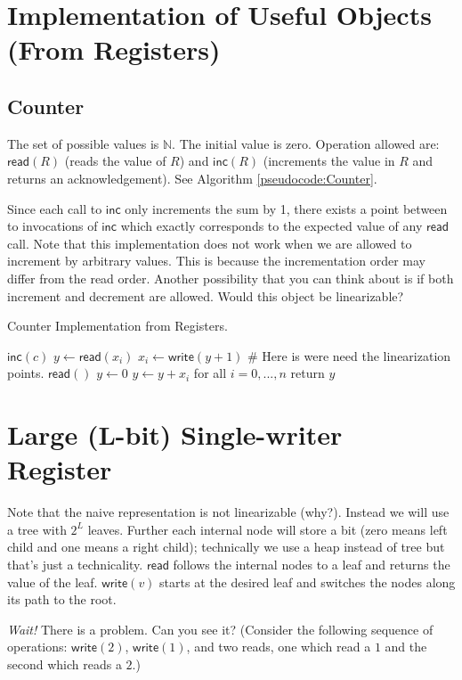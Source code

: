 \documentclass[twoside]{article}
\newcommand\N{\mathbb{N}}
\newcommand\READ{\mathsf{read}}
\newcommand\INC{\mathsf{inc}}
\newcommand\WRITE{\mathsf{write}}
\begin{document}
\section{Implementation of Useful Objects (From Registers)}
\subsection{Counter}
The set of possible values is $\N$. The initial value is zero. Operation allowed are: $\READ (R)$ (reads the value of $R$) and $\INC (R)$ (increments the value in $R$ and returns an acknowledgement). See Algorithm \ref{pseudocode:Counter}.

Since each call to $\INC$ only increments the sum by 1, there exists a point between to invocations of $\INC$ which exactly corresponds to the expected value of any $\READ$ call. Note that this implementation does not work when we are allowed to increment by arbitrary values. This is because the incrementation order may differ from the read order. Another possibility that you can think about is if both increment and decrement are allowed. Would this object be linearizable?

\begin{algorithm}
	\caption{Counter Implementation from Registers.}
    \label{pseudocode:Counter}
    \begin{algorithmic}[1]
    \State $\INC(c)$
    \State $y \leftarrow \READ(x_i)$
    \State $x_i \leftarrow \WRITE(y + 1)$ \# Here is were need the linearization points.
    \State
    \State $\READ()$
    \State $y \leftarrow 0$
    \State $y \leftarrow y + x_i$ for all $i = 0, ..., n$
    \State return $y$
    \end{algorithmic}
\end{algorithm}

\section{Large (L-bit) Single-writer Register}
Note that the naive representation is not linearizable (why?). Instead we will use a tree with $2^L$ leaves. Further each internal node will store a bit (zero means left child and one means a right child); technically we use a heap instead of tree but that's just a technicality. $\READ$ follows the internal nodes to a leaf and returns the value of the leaf. $\WRITE(v)$ starts at the desired leaf and switches the nodes along its path to the root.

\emph{Wait!} There is a problem. Can you see it? (Consider the following sequence of operations: $\WRITE(2)$, $\WRITE(1)$, and two reads, one which read a $1$ and the second which reads a $2$.) 
\end{document}
